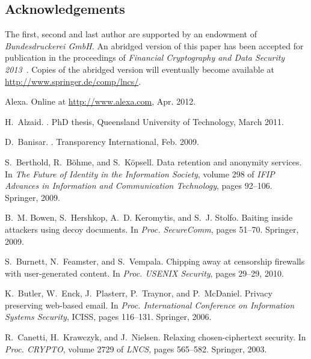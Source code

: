 \documentclass[twocolumn,10pt]{article}
\begin{document}
\subsection*{Acknowledgements}

The first, second and last author are supported by an endowment of
\emph{Bundesdruckerei GmbH.}  An abridged version of this paper has been
accepted for publication in the proceedings of \emph{Financial Cryptography
  and Data Security 2013}~\cite{RothGRDR2013}.  Copies of the abridged
version will eventually become available at
\url{http://www.springer.de/comp/lncs/}.

\flushleft
\begin{thebibliography}{10}

{Alexa}.
\newblock Online at \url{http://www.alexa.com}, Apr. 2012.

H.~Alzaid.
.
\newblock PhD thesis, Queensland University of Technology, March 2011.

D.~Banisar.
.
\newblock Transparency International, Feb. 2009.

S.~Berthold, R.~B\"ohme, and S.~K\"opsell.
\newblock Data retention and anonymity services.
\newblock In {\em The Future of Identity in the Information Society}, volume
  298 of {\em IFIP Advances in Information and Communication Technology}, pages
  92--106. Springer, 2009.

B.~M. Bowen, S.~Hershkop, A.~D. Keromytis, and S.~J. Stolfo.
\newblock Baiting inside attackers using decoy documents.
\newblock In {\em Proc. SecureComm}, pages 51--70. Springer, 2009.

S.~Burnett, N.~Feamster, and S.~Vempala.
\newblock Chipping away at censorship firewalls with user-generated content.
\newblock In {\em Proc. USENIX Security}, pages 29--29, 2010.

K.~Butler, W.~Enck, J.~Plasterr, P.~Traynor, and P.~McDaniel.
\newblock Privacy preserving web-based email.
\newblock In {\em Proc. International Conference on Information Systems
  Security}, ICISS, pages 116--131. Springer, 2006.

R.~Canetti, H.~Krawczyk, and J.~Nielsen.
\newblock Relaxing chosen-ciphertext security.
\newblock In {\em Proc. CRYPTO}, volume 2729 of {\em LNCS}, pages 565--582.
  Springer, 2003.


\end{thebibliography}
\end{document}
